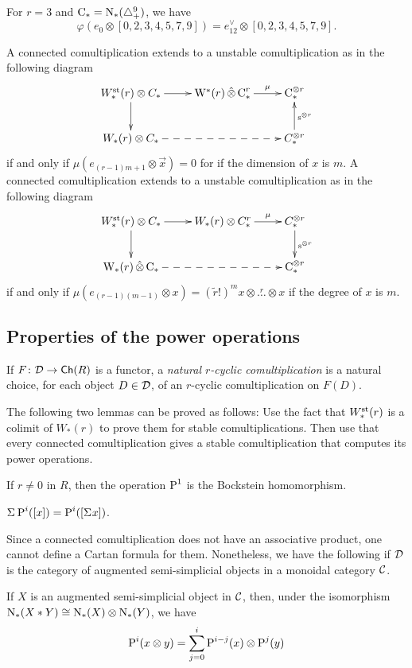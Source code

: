 \begin{example}\label{ex:105} For $r=3$ and $\operatorname{C}_*= \operatorname{N}_*(\triangle_{+}^9)$, we have
	\[
	\varphi(e_0\otimes [0,2,3,4,5,7,9]) = e^\vee_{12}\otimes [0,2,3,4,5,7,9].
	\]
\end{example}

A connected comultiplication extends to a unstable comultiplication as in the following diagram
\[
\xymatrix{
	W_*^{\st}(r)\otimes C_*\ar[r]\ar[d] & \rW^*(r)\hotimes \uchains_*^r \ar[r]^-{\mu} & \uchains_*^{\otimes r} \\
	W_*(r)\otimes C_*\ar@{-->}[rr] & & C_*^{\otimes r} \ar[u]_{\sus{\otimes r}}
}
\]
if and only if $\mu(e_{(r-1)m+1}\otimes\vec{x}) = 0$ for if the dimension of $x$ is $m$. A connected comultiplication extends to a unstable comultiplication as in the following diagram
\[
\xymatrix{
	W_*^{\st}(r)\otimes C_*\ar[r]\ar[d] & W_*(r)\otimes C_*^r \ar[r]^-{\mu} & C_*^{\otimes r} \ar[d]^{\sus{\otimes r}} \\
	\rW_*(r)\hotimes \uchains_*\ar@{-->}[rr] & & \uchains_*^{\otimes r}
}
\]
if and only if $\mu(e_{(r-1)(m-1)}\otimes x) = (\tilde{r}!)^mx\otimes \overset{r}{\ldots} \otimes x$ if the degree of $x$ is $m$.%

\subsection{Properties of the power operations}

If $F\colon \mathcal{D}\to \mathsf{Ch}(R)$ is a functor, a \emph{natural $r$-cyclic comultiplication} is a natural choice, for each object $D\in \mathcal{D}$, of an $r$-cyclic comultiplication on $F(D)$.

The following two lemmas can be proved as follows: Use the fact that $W^{\mathrm{st}}_*(r)$ is a colimit of $W_*(r)$ to prove them for stable comultiplications. Then use that every connected comultiplication gives a stable comultiplication that computes its power operations.
\begin{lemma}
	If $r\neq 0$ in $R$, then the operation $\operatorname{P}^1$ is the Bockstein homomorphism.
\end{lemma}
\begin{lemma}
	$\Sigma^{} \operatorname{P}^i([x]) = \operatorname{P}^i([\Sigma^{} x])$.
\end{lemma}
Since a connected comultiplication does not have an associative product, one cannot define a Cartan formula for them. Nonetheless, we have the following if $\mathcal{D}$ is the category of augmented semi-simplicial objects in a monoidal category $\mathcal{C}$.
\begin{lemma}
	If $X$ is an augmented semi-simplicial object in $\mathcal{C}$, then, under the isomorphism $\operatorname{N}_*(X*Y)\cong \operatorname{N}_*(X)\otimes\operatorname{N}_*(Y)$, we have
	\[
	\operatorname{P}^i(x\otimes y) = \sum_{j=0}^{i} \operatorname{P}^{i-j}(x)\otimes \operatorname{P}^j(y)
	\]
\end{lemma}

